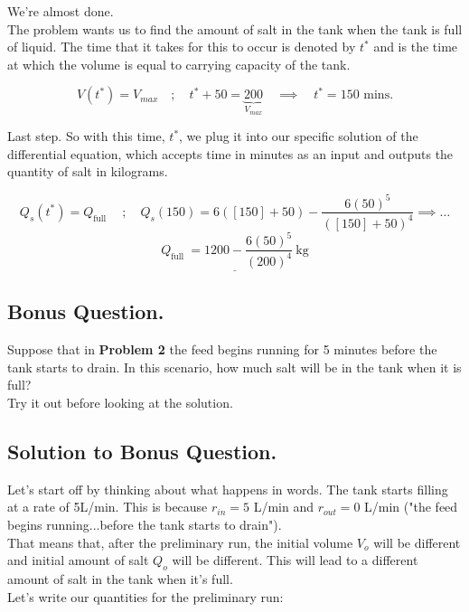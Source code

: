 \documentclass[a4paper,12pt]{article} %
\begin{document}
We're almost done.\\

The problem wants us to find the amount of salt in the tank when the tank is full of liquid. The time that it takes for this to occur is denoted by $t^*$ and is the time at which the volume is equal to carrying capacity of the tank.

$$ V\left(t^*\right)=V_{max} \quad ; \quad t^*+50=\underbrace{200}_{V_{max}} \quad \implies \quad t^*=150 \text { mins} . $$

Last step. So with this time, $t^*$, we plug it into our specific solution of the differential equation, which accepts time in minutes as an input and outputs the quantity of salt in kilograms.

$$
Q_s\left(t^*\right)=Q_{\text {full }} \quad; \quad Q_s(150)=6([150]+50)-\frac{6(50)^5}{([150]+50)^4} \implies \ldots$$
$$
\underline{\boxed{Q_{\text {full }}=1200-\frac{6(50)^5}{(200)^4} \mathrm{~kg}}} $$

\pagebreak 

\subsection*{Bonus Question.}
Suppose that in \textbf{Problem 2} the feed begins running for 5 minutes before the tank starts to drain. In this scenario, how much salt will be in the tank when it is full?\\

Try it out before looking at the solution.

\pagebreak

\subsection*{Solution to Bonus Question.}

Let's start off by thinking about what happens in words. The tank starts filling at a rate of 5L/min. This is because $r_{in} = 5$ L/min and $r_{out} = 0$ L/min ("the feed begins running...before the tank starts to drain").\\

That means that, after the preliminary run, the initial volume $V_o$ will be different and initial amount of salt $Q_o$ will be different. This will lead to a different amount of salt in the tank when it's full.\\

Let's write our quantities for the preliminary run:
\end{document}
